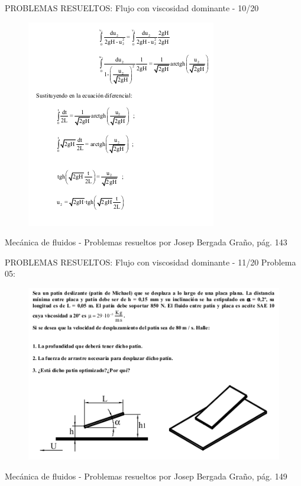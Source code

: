 \begin{frame}{PROBLEMAS RESUELTOS: Flujo con viscosidad dominante - 10/20}
\justifying
\begin{figure}[H]
\centering
\includegraphics[scale=0.5]{Section_Files/S2-imagenes-Jhon/Book-ProbResuelts/P38-E05.png}
\end{figure}
{\tiny Mecánica de fluidos - Problemas resueltos por Josep Bergada Graño, pág. 143}
\end{frame}

\begin{frame}{PROBLEMAS RESUELTOS: Flujo con viscosidad dominante - 11/20}
\justifying
Problema 05:
\begin{figure}[H]
\centering
\includegraphics[scale=0.5]{Section_Files/S2-imagenes-Jhon/Book-ProbResuelts/P40-E01.png}
\end{figure}
{\tiny Mecánica de fluidos - Problemas resueltos por Josep Bergada Graño, pág. 149}
\end{frame}

